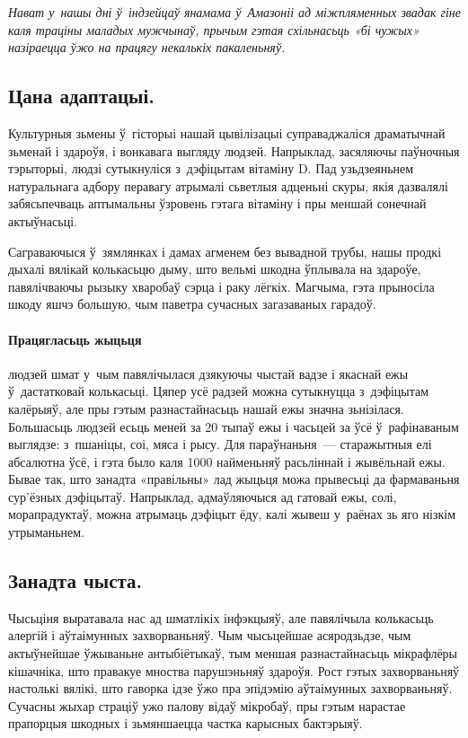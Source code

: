 \emph{Нават у~нашы дні ў~індзейцаў янамама ў~Амазоніі ад міжпляменных звадак гіне каля траціны маладых мужчынаў, прычым гэтая схільнасьць «бі чужых» назіраецца ўжо на працягу некалькіх пакаленьняў.}

\subsection*{Цана адаптацыі.}

Культурныя зьмены ў~гісторыі нашай цывілізацыі суправаджаліся драматычнай зьменай і здароўя, і вонкавага выгляду людзей. Напрыклад, засяляючы паўночныя тэрыторыі, людзі сутыкнуліся з~дэфіцытам вітаміну D. Пад узьдзеяньнем натуральнага адбору перавагу атрымалі сьветлыя адценьні скуры, якія дазвалялі забясьпечваць аптымальны ўзровень гэтага вітаміну і пры меншай сонечнай актыўнасьці. 

Саграваючыся ў~зямлянках і дамах агменем без вывадной трубы, нашы продкі дыхалі вялікай колькасьцю дыму, што вельмі шкодна ўплывала на здароўе, павялічваючы рызыку хваробаў сэрца і раку лёгкіх. Магчыма, гэта прыносіла шкоду яшчэ большую, чым паветра сучасных загазаваных гарадоў.

\paragraph{Працягласьць жыцьця} людзей шмат у~чым павялічылася дзякуючы чыстай вадзе і якаснай ежы ў~дастатковай колькасьці. Цяпер усё радзей можна сутыкнуцца з~дэфіцытам калёрыяў, але пры гэтым разнастайнасьць нашай ежы значна зьнізілася. Большасьць людзей есьць меней за 20 тыпаў ежы і часьцей за ўсё ў~рафінаваным выглядзе: з~пшаніцы, соі, мяса і рысу. Для параўнаньня~--- старажытныя елі абсалютна ўсё, і гэта было каля 1000 найменьняў расьліннай і жывёльнай ежы. Бывае так, што занадта «правільны» лад жыцьця можа прывесьці да фармаваньня сур'ёзных дэфіцытаў. Напрыклад, адмаўляючыся ад гатовай ежы, солі, морапрадуктаў, можна атрымаць дэфіцыт ёду, калі жывеш у~раёнах зь яго нізкім утрыманьнем.

\subsection*{Занадта чыста.} 

Чысьціня выратавала нас ад шматлікіх інфэкцыяў, але павялічыла колькасьць алергій і аўтаімунных захворваньняў. Чым чысьцейшае асяродзьдзе, чым актыўнейшае ўжываньне антыбіётыкаў, тым меншая разнастайнасьць мікрафлёры кішачніка, што правакуе мноства парушэньняў здароўя. Рост гэтых захворваньняў настолькі вялікі, што гаворка ідзе ўжо пра эпідэмію аўтаімунных захворваньняў. Сучасны жыхар страціў ужо палову відаў мікробаў, пры гэтым нарастае прапорцыя шкодных і зьмяншаецца частка карысных бактэрыяў.


